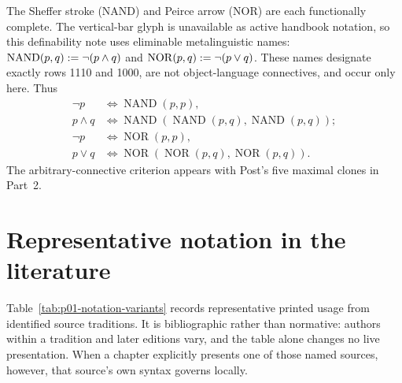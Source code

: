 The Sheffer stroke (NAND) and Peirce arrow (NOR) are each functionally
complete.
The vertical-bar glyph is unavailable as active handbook notation, so this
definability note uses eliminable metalinguistic names:
\(\operatorname{NAND}(p,q)\mathrel{:=}\neg(p\land q)\) and
\(\operatorname{NOR}(p,q)\mathrel{:=}\neg(p\lor q)\).  These names designate
exactly rows 1110 and 1000, are not object-language connectives, and occur
only here.  Thus
\[
\begin{aligned}
\neg p&\Leftrightarrow\operatorname{NAND}(p,p),\\
p\land q&\Leftrightarrow
 \operatorname{NAND}(\operatorname{NAND}(p,q),
                     \operatorname{NAND}(p,q));\\
\neg p&\Leftrightarrow\operatorname{NOR}(p,p),\\
p\lor q&\Leftrightarrow
 \operatorname{NOR}(\operatorname{NOR}(p,q),
                    \operatorname{NOR}(p,q)).
\end{aligned}
\]
The arbitrary-connective criterion appears with Post's five maximal clones
in Part~2.

\section{Representative notation in the literature}
\label{sec:p01-notation-variants}

Table~\ref{tab:p01-notation-variants} records representative printed usage
from identified source traditions.  It is bibliographic rather than
normative: authors within a tradition and later editions vary, and the table
alone changes no live presentation.  When a chapter explicitly presents one
of those named sources, however, that source's own syntax governs locally.

